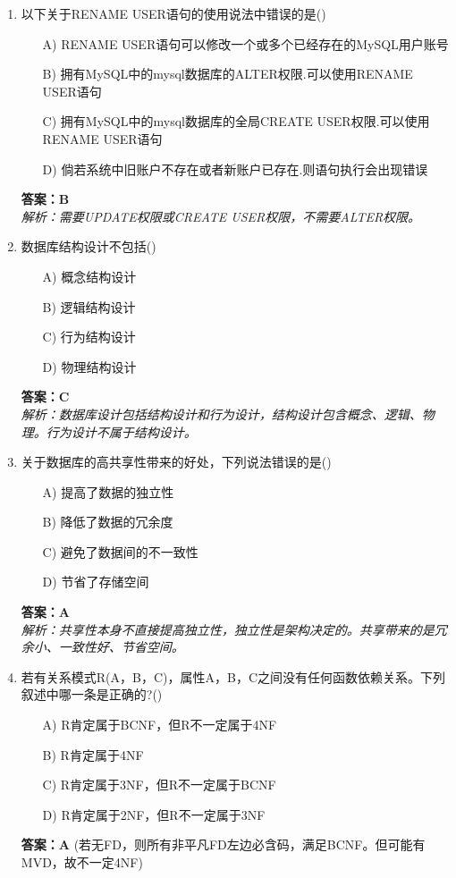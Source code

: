 \documentclass[a4paper,12pt]{article}
\begin{document}
\begin{enumerate}[label=\arabic*.]
\item 以下关于RENAME USER语句的使用说法中错误的是()
\begin{itemize}
    \item[A)] RENAME USER语句可以修改一个或多个已经存在的MySQL用户账号
    \item[B)] 拥有MySQL中的mysql数据库的ALTER权限.可以使用RENAME USER语句
    \item[C)] 拥有MySQL中的mysql数据库的全局CREATE USER权限.可以使用RENAME USER语句
    \item[D)] 倘若系统中旧账户不存在或者新账户已存在.则语句执行会出现错误
\end{itemize}
\textbf{答案：B} \\
\textit{解析：需要UPDATE权限或CREATE USER权限，不需要ALTER权限。}

\item 数据库结构设计不包括()
\begin{itemize}
    \item[A)] 概念结构设计
    \item[B)] 逻辑结构设计
    \item[C)] 行为结构设计
    \item[D)] 物理结构设计
\end{itemize}
\textbf{答案：C} \\
\textit{解析：数据库设计包括结构设计和行为设计，结构设计包含概念、逻辑、物理。行为设计不属于结构设计。}

\item 关于数据库的高共享性带来的好处，下列说法错误的是()
\begin{itemize}
    \item[A)] 提高了数据的独立性
    \item[B)] 降低了数据的冗余度
    \item[C)] 避免了数据间的不一致性
    \item[D)] 节省了存储空间
\end{itemize}
\textbf{答案：A} \\
\textit{解析：共享性本身不直接提高独立性，独立性是架构决定的。共享带来的是冗余小、一致性好、节省空间。}

\item 若有关系模式R(A，B，C)，属性A，B，C之间没有任何函数依赖关系。下列叙述中哪一条是正确的?()
\begin{itemize}
    \item[A)] R肯定属于BCNF，但R不一定属于4NF
    \item[B)] R肯定属于4NF
    \item[C)] R肯定属于3NF，但R不一定属于BCNF
    \item[D)] R肯定属于2NF，但R不一定属于3NF
\end{itemize}
\textbf{答案：A} (若无FD，则所有非平凡FD左边必含码，满足BCNF。但可能有MVD，故不一定4NF)


\end{enumerate}
\end{document}
